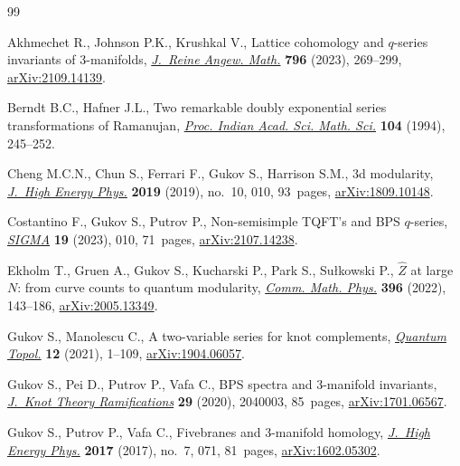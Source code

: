 \documentclass[pdftex]{sigma}
\numberwithin{equation}{section}
\begin{document}
\begin{thebibliography}{99}
\footnotesize\itemsep=0pt

Akhmechet R., Johnson P.K., Krushkal V., Lattice cohomology and {$q$}-series
 invariants of 3-manifolds, \href{https://doi.org/10.1515/crelle-2022-0096}{\textit{J.~Reine Angew. Math.}} \textbf{796}
 (2023), 269--299, \href{https://arxiv.org/abs/2109.14139}{arXiv:2109.14139}.

Berndt B.C., Hafner J.L., Two remarkable doubly exponential series
 transformations of {R}amanujan, \href{https://doi.org/10.1007/BF02830888}{\textit{Proc. Indian Acad. Sci. Math. Sci.}}
 \textbf{104} (1994), 245--252.

Cheng M.C.N., Chun S., Ferrari F., Gukov S., Harrison S.M., 3d modularity,
 \href{https://doi.org/10.1007/jhep10(2019)010}{\textit{J.~High Energy Phys.}} \textbf{2019} (2019), no.~10, 010, 93~pages,
 \href{https://arxiv.org/abs/1809.10148}{arXiv:1809.10148}.

Costantino F., Gukov S., Putrov P., Non-semisimple {TQFT}'s and {BPS}
 {$q$}-series, \href{https://doi.org/10.3842/SIGMA.2023.010}{\textit{SIGMA}} \textbf{19} (2023), 010, 71~pages, \href{https://arxiv.org/abs/2107.14238}{arXiv:2107.14238}.

Ekholm T., Gruen A., Gukov S., Kucharski P., Park S., Su{\l}kowski P.,
 {$\widehat{Z}$} at large {$N$}: from curve counts to quantum modularity,
 \href{https://doi.org/10.1007/s00220-022-04469-9}{\textit{Comm. Math. Phys.}} \textbf{396} (2022), 143--186,
 \href{https://arxiv.org/abs/2005.13349}{arXiv:2005.13349}.

Gukov S., Manolescu C., A two-variable series for knot complements,
 \href{https://doi.org/10.4171/qt/145}{\textit{Quantum Topol.}} \textbf{12} (2021), 1--109, \href{https://arxiv.org/abs/1904.06057}{arXiv:1904.06057}.

Gukov S., Pei D., Putrov P., Vafa C., B{PS} spectra and 3-manifold invariants,
 \href{https://doi.org/10.1142/S0218216520400039}{\textit{J.~Knot Theory Ramifications}} \textbf{29} (2020), 2040003, 85~pages,
 \href{https://arxiv.org/abs/1701.06567}{arXiv:1701.06567}.

Gukov S., Putrov P., Vafa C., Fivebranes and 3-manifold homology,
 \href{https://doi.org/10.1007/JHEP07(2017)071}{\textit{J.~High Energy Phys.}} \textbf{2017} (2017), no.~7, 071, 81~pages,
 \href{https://arxiv.org/abs/1602.05302}{arXiv:1602.05302}.


\end{thebibliography}
\end{document}
